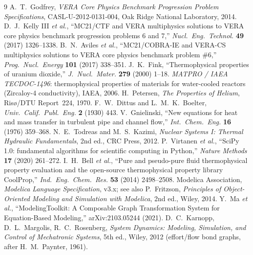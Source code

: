 \documentclass[11pt]{article}
\begin{document}
\begin{thebibliography}{9}\small
{} A.~T.~Godfrey, \emph{VERA Core Physics Benchmark Progression
Problem Specifications}, CASL-U-2012-0131-004, Oak Ridge National Laboratory, 2014.
 D.~J.~Kelly III \emph{et al.}, ``MC21/CTF and VERA multiphysics
solutions to VERA core physics benchmark progression problems 6 and 7,''
\emph{Nucl.\ Eng.\ Technol.} \textbf{49} (2017) 1326--1338.
 B.~N.~Aviles \emph{et al.}, ``MC21/COBRA-IE and VERA-CS
multiphysics solutions to VERA core physics benchmark problem \#6,''
\emph{Prog.\ Nucl.\ Energy} \textbf{101} (2017) 338--351.
 J.~K.~Fink, ``Thermophysical properties of uranium dioxide,''
\emph{J.\ Nucl.\ Mater.} \textbf{279} (2000) 1--18.
 \emph{MATPRO / IAEA TECDOC-1496}: thermophysical properties of
materials for water-cooled reactors (Zircaloy-4 conductivity), IAEA, 2006.
 H.~Petersen, \emph{The Properties of Helium}, Risø/DTU
Report~224, 1970.
 F.~W.~Dittus and L.~M.~K.~Boelter, \emph{Univ.\ Calif.\ Publ.\
Eng.} \textbf{2} (1930) 443.
 V.~Gnielinski, ``New equations for heat and mass transfer
in turbulent pipe and channel flow,'' \emph{Int.\ Chem.\ Eng.} \textbf{16}
(1976) 359--368.
 N.~E.~Todreas and M.~S.~Kazimi, \emph{Nuclear Systems I:
Thermal Hydraulic Fundamentals}, 2nd ed., CRC Press, 2012.
 P.~Virtanen \emph{et al.}, ``SciPy 1.0: fundamental algorithms
for scientific computing in Python,'' \emph{Nature Methods} \textbf{17} (2020)
261--272.
 I.~H.~Bell \emph{et al.}, ``Pure and pseudo-pure fluid
thermophysical property evaluation and the open-source thermophysical property
library CoolProp,'' \emph{Ind.\ Eng.\ Chem.\ Res.} \textbf{53} (2014)
2498--2508.
 Modelica Association, \emph{Modelica Language Specification},
v3.x; see also P.~Fritzson, \emph{Principles of Object-Oriented Modeling and
Simulation with Modelica}, 2nd ed., Wiley, 2014.
 Y.~Ma \emph{et al.}, ``ModelingToolkit: A Composable Graph
Transformation System for Equation-Based Modeling,'' arXiv:2103.05244 (2021).
\bibitem{bondgraph} D.~C.~Karnopp, D.~L.~Margolis, R.~C.~Rosenberg, \emph{System
Dynamics: Modeling, Simulation, and Control of Mechatronic Systems}, 5th ed.,
Wiley, 2012 (effort/flow bond graphs, after H.~M.~Paynter, 1961).
\end{thebibliography}
\end{document}
